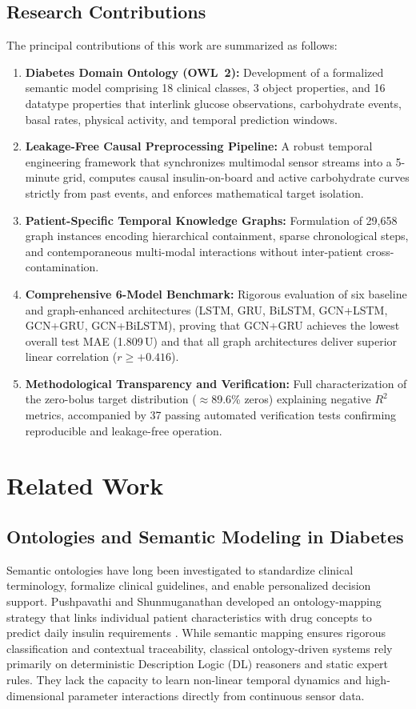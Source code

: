\documentclass[10pt,a4paper]{article}
\begin{document}
\subsection{Research Contributions}
The principal contributions of this work are summarized as follows:
\begin{enumerate}
    \item \textbf{Diabetes Domain Ontology (OWL~2):} Development of a formalized semantic model comprising 18 clinical classes, 3 object properties, and 16 datatype properties that interlink glucose observations, carbohydrate events, basal rates, physical activity, and temporal prediction windows.
    \item \textbf{Leakage-Free Causal Preprocessing Pipeline:} A robust temporal engineering framework that synchronizes multimodal sensor streams into a 5-minute grid, computes causal insulin-on-board and active carbohydrate curves strictly from past events, and enforces mathematical target isolation.
    \item \textbf{Patient-Specific Temporal Knowledge Graphs:} Formulation of 29,658 graph instances encoding hierarchical containment, sparse chronological steps, and contemporaneous multi-modal interactions without inter-patient cross-contamination.
    \item \textbf{Comprehensive 6-Model Benchmark:} Rigorous evaluation of six baseline and graph-enhanced architectures (LSTM, GRU, BiLSTM, GCN+LSTM, GCN+GRU, GCN+BiLSTM), proving that GCN+GRU achieves the lowest overall test MAE (1.809\,U) and that all graph architectures deliver superior linear correlation ($r \ge +0.416$).
    \item \textbf{Methodological Transparency and Verification:} Full characterization of the zero-bolus target distribution ($\approx$89.6\% zeros) explaining negative $R^2$ metrics, accompanied by 37 passing automated verification tests confirming reproducible and leakage-free operation.
\end{enumerate}

\section{Related Work}
\subsection{Ontologies and Semantic Modeling in Diabetes}
Semantic ontologies have long been investigated to standardize clinical terminology, formalize clinical guidelines, and enable personalized decision support. Pushpavathi and Shunmuganathan developed an ontology-mapping strategy that links individual patient characteristics with drug concepts to predict daily insulin requirements \cite{pushpavathi2024}. While semantic mapping ensures rigorous classification and contextual traceability, classical ontology-driven systems rely primarily on deterministic Description Logic (DL) reasoners and static expert rules. They lack the capacity to learn non-linear temporal dynamics and high-dimensional parameter interactions directly from continuous sensor data.
\end{document}
